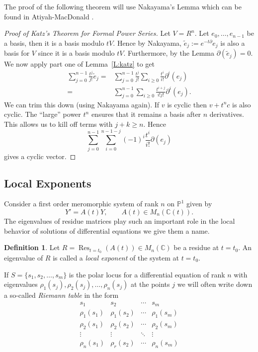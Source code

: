 \documentclass[]{book}
\numberwithin{equation}{section}
\theoremstyle{definition}
\newtheorem{definition}[theorem]{Definition}
\theoremstyle{remark}
\newcommand{\CC}{\mathbb{C}}
\newcommand{\PP}{\mathbb{P}}
\newcommand{\Res}{\operatorname{Res}}
\begin{document}
The proof of the following theorem will use Nakayama's Lemma which can be found in Atiyah-MacDonald \cite[pg 21]{Atiyah2016}.
\begin{proof}[Proof of Katz's Theorem for Formal Power Series]
	Let $V = R^n$. 
	Let $e_0,\ldots,e_{n-1}$ be a basis, then it is a basis modulo $tV$. 
	Hence by Nakayama, $\widetilde{e}_j:=e^{-t\partial }e_j$ is also a basis for $V$ since it is a basis modulo $tV$. 
	Furthermore, by the Lemma $\partial(\widetilde{e}_j)=0$. 
	We now apply part one of Lemma~\ref{L:katz} to get 
	\begin{align*}
	\sum_{j=0}^{n-1} \frac{t^j}{j!}\widetilde{e}_j =& \sum_{j=0}^{n-1}\frac{t^j}{j!} \sum_{i\geq 0}\frac{t^i}{i!} \partial^i(e_j) \\
	=& \sum_{j=0}^{n-1}\sum_{i\geq 0}\frac{t^{i+j}}{i!j!} \partial^i(e_j).
	\end{align*}
	We can trim this down (using Nakayama again). 
	If $v$ is cyclic then $v+t^n c$ is also cyclic. 
	The ``large'' power $t^n$ ensures that it remains a basis after $n$ derivatives. 
	This allows us to kill off terms with $j+k \geq n$. 
	Hence 
	$$ \sum_{j=0}^{n-1}\sum_{i=0}^{n-1-j}(-1)^i \frac{t^i}{i!}\partial(e_j) $$
	gives a cyclic vector.
\end{proof}

\subsection{Local Exponents}
Consider a first order meromorphic system of rank $n$ on $\PP^1$ given by 
$$ Y' = A(t) Y, \qquad A(t) \in M_n(\CC(t)).$$
The eigenvalues of residue matrices play such an important role in the local behavior of solutions of differential equations we give them a name.
\begin{definition}
	Let $R= \Res_{t=t_0}(A(t)) \in M_n(\CC)$ be a residue at $t=t_0$.
	An eigenvalue of $R$ is called a \emph{local exponent} of the system at $t=t_0$.
\end{definition}
If $S=\lbrace s_1,s_2,\ldots,s_m \rbrace$ is the polar locus for a differential equation of rank $n$ with eigenvalues $\rho_1(s_j),\rho_2(s_j),\ldots, \rho_n(s_j)$ at the points $j$ we will often write down a so-called \emph{Riemann table} in the form
$$\begin{array}{cccc}
	s_1 & s_2 & \cdots & s_m \\
	\hline \hline 
	\rho_1(s_1) & \rho_1(s_2) & \cdots & \rho_1(s_m) \\
	\rho_2(s_1) & \rho_2(s_2) & \cdots & \rho_2(s_m) \\
	\vdots & \vdots & \ddots &\vdots \\
	\rho_n(s_1) & \rho_r(s_2) & \cdots & \rho_n(s_m)
\end{array}$$
\end{document}
